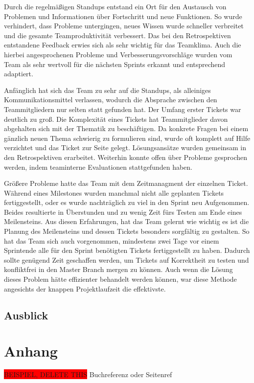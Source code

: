 \documentclass[10pt, a4paper]{article}
\begin{document}
Durch die regelmäßigen Standups entstand ein Ort für den Austausch von Problemen und Informationen über Fortschritt und neue Funktionen.
So wurde verhindert, dass Probleme untergingen, neues Wissen wurde schneller verbreitet und die gesamte Teamproduktivität verbessert.
Das bei den Retrospektiven entstandene Feedback erwies sich als sehr wichtig für das Teamklima.
Auch die hierbei angesprochenen Probleme und Verbesserungsvorschläge wurden vom Team als sehr wertvoll für die nächsten Sprints erkannt und entsprechend adaptiert.

Anfänglich hat sich das Team zu sehr auf die Standups, als alleiniges Kommunikationsmittel verlassen, wodurch die Absprache zwischen den Teammitgliedern nur selten statt gefunden hat.
Der Umfang erster Tickets war deutlich zu groß.
Die Komplexität eines Tickets hat Teammitglieder davon abgehalten sich mit der Thematik zu beschäftigen.
Da konkrete Fragen bei einem gänzlich neuen Thema schwierig zu formulieren sind, wurde oft komplett auf Hilfe verzichtet und das Ticket zur Seite gelegt.
Lösungsansätze wurden gemeinsam in den Retrospektiven erarbeitet.
Weiterhin konnte offen über Probleme gesprochen werden, indem teaminterne Evaluationen stattgefunden haben.

Größere Probleme hatte das Team mit dem Zeitmanagment der einzelnen Ticket.
Während eines Milestones wurden manchmal nicht alle geplanten Tickets fertiggestellt, oder es wurde nachträglich zu viel in den Sprint neu Aufgenommen.
Beides resultierte in Überstunden und zu wenig Zeit fürs Testen am Ende eines Meilensteins.
Aus diesen Erfahrungen, hat das Team gelernt wie wichtig es ist die Planung des Meilensteins und dessen Tickets besonders sorgfältig zu gestalten.
So hat das Team sich auch vorgenommen, mindestens zwei Tage vor einem Sprintende alle für den Sprint benötigten Tickets fertiggestellt zu haben.
Dadurch sollte genügend Zeit geschaffen werden, um Tickets auf Korrektheit zu testen und konfliktfrei in den Master Branch mergen zu können.
Auch wenn die Lösung dieses Problem hätte effizienter behandelt werden können, war diese Methode angesichts der knappen Projektlaufzeit die effektivste.
\subsection{Ausblick}
\newpage
\section{Anhang}
\colorbox{red}{BEISPIEL, DELETE THIS} Buchreferenz \cite{Literaturbeispiel:tom} oder Seitenref \cite{google}
\printbibliography
\end{document}
